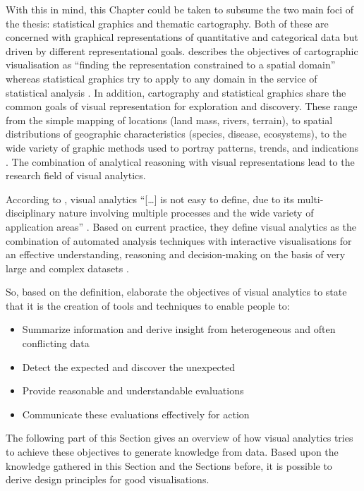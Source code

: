 With this in mind, this Chapter could be taken to subsume the two main foci of the thesis: statistical graphics and thematic cartography. Both of these are concerned with graphical representations of quantitative and categorical data but driven by different representational goals. \citeauthor{Friendly.2001} describes the objectives of cartographic visualisation as ``finding the representation constrained to a spatial domain'' whereas statistical graphics try to apply to any domain in the service of statistical analysis . In addition, cartography and statistical graphics share the common goals of visual representation for exploration and discovery. These range from the simple mapping of locations (land mass, rivers, terrain), to spatial distributions of geographic characteristics (species, disease, ecosystems), to the wide variety of graphic methods used to portray patterns, trends, and indications . The combination of analytical reasoning with visual representations lead to the research field of visual analytics.

According to \citeauthor{Keim2010}, visual analytics ``[\ldots] is not easy to define, due to its multi-disciplinary nature involving multiple processes and the wide variety of application areas'' . Based on current practice, they define visual analytics as the combination of automated analysis techniques with interactive visualisations for an effective understanding, reasoning and decision-making on the basis of very large and complex datasets .

So, based on the definition, \citeauthor{Keim2010} elaborate the objectives of visual analytics to state that it is the creation of tools and techniques to enable people to:

\begin{itemize}
\item Summarize information and derive insight from heterogeneous and often conflicting data
\item Detect the expected and discover the unexpected
\item Provide reasonable and understandable evaluations
\item Communicate these evaluations effectively for action
\end{itemize}

The following part of this Section gives an overview of how visual analytics tries to achieve these objectives to generate knowledge from data. Based upon the knowledge gathered in this Section and the Sections before, it is possible to derive design principles for good visualisations.

